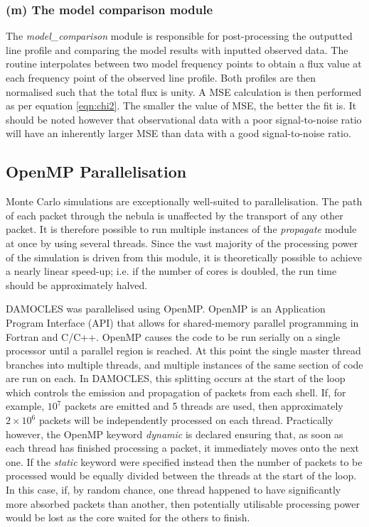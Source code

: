 		\subsubsection{(m) The model comparison module}
		The \textit{model\_comparison} module is responsible for post-processing the outputted line profile and comparing the model results with inputted observed data.  The routine interpolates between two model frequency points to obtain a flux value at each frequency point of the observed line profile.  Both profiles are then normalised such that the total flux is unity.  A MSE calculation is then performed as per equation \ref{eqn:chi2}. The smaller the value of MSE, the better the fit is.  It should be noted however that observational data with a poor signal-to-noise ratio will have an inherently larger MSE than data with a good signal-to-noise ratio.
		
		
		\subsection{OpenMP Parallelisation}	
		\label{scn:open_mp}
		
	Monte Carlo simulations are exceptionally well-suited to parallelisation.  The path of each packet through the nebula is unaffected by the transport of any other packet.  It is therefore possible to run multiple instances of the \textit{propagate} module at once by using several threads.  Since the vast majority of the processing power of the simulation is driven from this module, it is theoretically possible to achieve a nearly linear speed-up; i.e. if the number of cores is doubled, the run time should be approximately halved.  %
	
	DAMOCLES was parallelised using OpenMP.  OpenMP is an Application Program Interface (API) that allows for shared-memory parallel programming in Fortran and C/C++.  OpenMP causes the code to be run serially on a single processor until a parallel region is reached.  At this point the single master thread branches into multiple threads, and multiple instances of the same section of code are run on each.  In DAMOCLES, this splitting occurs at the start of the loop which controls the emission and propagation of packets from each shell.  If, for example, $10^7$ packets are emitted and 5 threads are used, then approximately $2 \times 10^6$ packets will be independently processed on each thread.  Practically however, the OpenMP keyword \textit{dynamic} is declared ensuring that, as soon as each thread has finished processing a packet, it immediately moves onto the next one.  If the \textit{static} keyword were specified instead then the number of packets to be processed would be equally divided between the threads at the start of the loop.  In this case, if, by random chance, one thread happened to have significantly more absorbed packets than another, then potentially utilisable processing power would be lost as the core waited for the others to finish.
	
